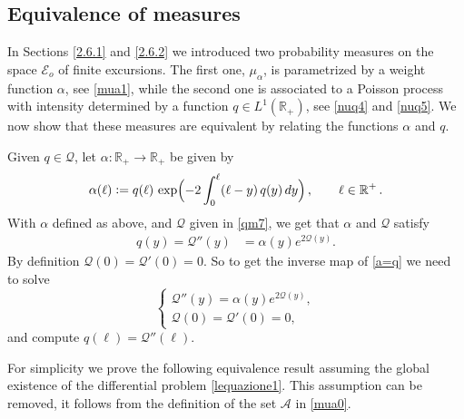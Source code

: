 \documentclass[12pt]{article}
\numberwithin{equation}{section}
\newcommand{\RR}{\mathbb R}
\newcommand{\cE}{\mathcal E}
\begin{document}
\subsection{Equivalence of measures}\label{equiv}

	
 	In Sections \ref{2.6.1} and \ref{2.6.2} we introduced two probability measures on the space $\cE_o$ of finite excursions. The first one, $\mu_{\alpha}$, is parametrized by a weight function $\alpha$, see \eqref{mua1}, while the second one is associated to a Poisson process with intensity determined by a function $q \in L^1(\RR_+)$, see \eqref{nuq4} and \eqref{nuq5}. We now show that these measures are equivalent by relating the functions $\alpha$ and $q$.
	
	 Given $q\in \mathscr Q$, let $\alpha:\RR_+\to \RR_+$ be given by
	\begin{align}
		\label{a=q}
		\alpha(\ell) \vcentcolon= q(\ell)\, \exp\Bigl(-2\int_0^\ell(\ell-y)\, q(y)\, dy\Bigr)\,, \qquad \ell\in \mathbb R^+\,.
	\end{align}
	With $\alpha$ defined as above, and $\mathcal Q$ given in \eqref{qm7}, we get that $\alpha$ and $\mathcal Q$ satisfy 
	\begin{align}
		\label{a=q3}
		q(y)=\mathcal Q''(y)& =\alpha(y) e^{2\mathcal Q(y)}.
	\end{align}
	By definition $\mathcal Q(0)=\mathcal Q'(0)=0$. So to get the inverse map of \eqref{a=q} we need to solve 
	\begin{equation}\label{lequazione1}
		\left\{
		\begin{array}{l}
			\mathcal Q''(y)=\alpha(y) e^{2\mathcal Q(y)}, \\
			\mathcal Q(0)=\mathcal Q'(0)=0,
		\end{array}
		\right.
	\end{equation}
	and compute $q(\ell)=\mathcal Q''(\ell)$.
	
	For simplicity we prove the following equivalence result assuming the global existence of the differential problem \eqref{lequazione1}. This assumption can be removed, it follows from the definition of the set $\mathcal A$ in \eqref{mua0}.
	
	
	
\end{document}
